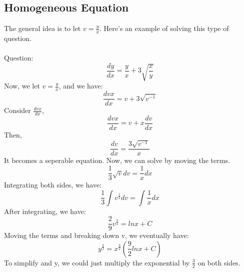 \documentclass{article}
\begin{document}
\subsection{Homogeneous Equation}
The general idea is to let $v = \frac{y}{x}$. Here's an example of solving this type of question.
\\
\\
Question: 
\begin{equation*}
	\frac{dy}{dx} = \frac{y}{x} + 3\sqrt{\frac{x}{y}}
\end{equation*}
Now, we let $v= \frac{y}{x}$, and we have:
\begin{equation*}
	\frac{dvx}{dx} = v + 3\sqrt{v^{-1}}
\end{equation*}
Consider $\frac{dvx}{dx}$,
\begin{equation*}
	\frac{dvx}{dx} = v + x\frac{dv}{dx}
\end{equation*}
Then,
\begin{equation*}
	\frac{dv}{dx} = \frac{3\sqrt{v^{-1}}}{x}
\end{equation*}
It becomes a seperable equation. Now, we can solve by moving the terms.
\begin{equation*}
	\frac{1}{3} \sqrt{v}dv = \frac{1}{x}dx
\end{equation*}
Integrating both sides, we have:
\begin{equation*}
	\frac{1}{3}\int v^{\frac{1}{2}}dv = \int \frac{1}{x}dx
\end{equation*}
After integrating, we have:
\begin{equation*}
	\frac{2}{9}v^{\frac{3}{2}} = lnx + C
\end{equation*}
Moving the terms and breaking down v, we eventually have:
\begin{equation*}
	y^{\frac{3}{2}} = x^{\frac{3}{2}}(\frac{9}{2}lnx + C)
\end{equation*}
To simplify and y, we could just multiply the exponential by $\frac{3}{2}$ on both sides.
\end{document}
